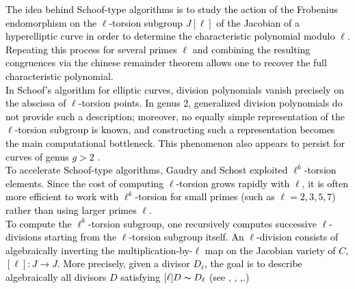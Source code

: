 \documentclass[11pt,a4paper]{article}
\theoremstyle{plain}
\theoremstyle{definition}
\theoremstyle{remark}
\newcommand{\verde}[1]{\textcolor{black}{#1}}
\newcommand{\azul}[1]{\textcolor{black}{#1}}
\begin{document}
\azul{The idea behind Schoof-type algorithms is to study the action of the Frobenius endomorphism on the $\ell$-torsion subgroup $J[\ell]$ of the Jacobian of a hyperelliptic curve in order to determine the characteristic polynomial modulo $\ell$. Repeating this process for several primes $\ell$ and combining the resulting congruences via the \verde{ chinese remainder theorem} allows one to recover the full characteristic polynomial.
\\
In Schoof's algorithm for elliptic curves, division polynomials \verde{vanish precisely on the abscissa of $\ell$-torsion points}.  In genus 2, generalized division polynomials \cite{Cantor1994} do not provide such a description; moreover, no equally simple representation of the $\ell$-torsion subgroup is known, and constructing such a representation becomes the main computational bottleneck. This phenomenon also appears to persist for curves of genus $g>2$ \cite{Abelard2018} .
\\
To accelerate Schoof-type algorithms, Gaudry and Schost exploited $\ell^k$-torsion elements. Since the cost of computing $\ell$-torsion grows rapidly with $\ell$, it is often more efficient to work with $\ell^k$-torsion for small primes (such as $\ell=2,3,5,7$) rather than using larger primes $\ell$.\\
To compute the $\ell^k$-torsion subgroup, one recursively computes successive $\ell$-divisions starting from the $\ell$-torsion subgroup itself. An $\ell$-division consists of algebraically inverting the multiplication-by-$\ell$ map  on the Jacobian variety of $C$, $[\ell]:J\to J.$ 
More precisely, given a divisor $D_\ell$, the goal is to describe algebraically all divisors $D$ satisfying \verde{$[\ell]D\thicksim  D_{\ell}$} (see  \cite{GS12}, \cite{Miret24}, \cite{riquelme2016},\cite{Riquelme2019}.)
}
\end{document}
